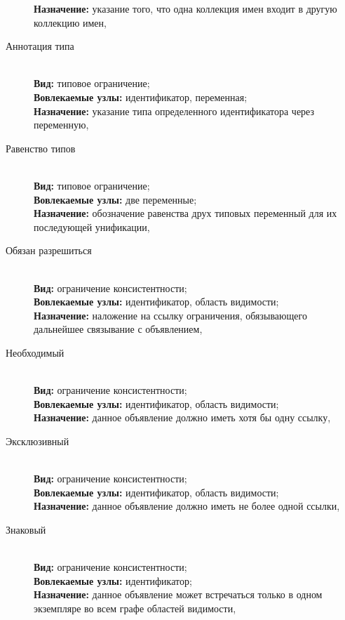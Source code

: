 \begin{description}
        \textbf{Назначение:} указание того, что одна коллекция
        имен входит в другую коллекцию имен, 
    \item[Аннотация типа] \
        \\
        \textbf{Вид:} типовое ограничение; \\
        \textbf{Вовлекаемые узлы:} идентификатор, переменная; \\
        \textbf{Назначение:} указание типа определенного
        идентификатора через переменную, 
    \item[Равенство типов] \
        \\
        \textbf{Вид:} типовое ограничение; \\
        \textbf{Вовлекаемые узлы:} две переменные; \\
        \textbf{Назначение:} обозначение равенства друх типовых 
        переменный для их последующей унификации, 
    \item[Обязан разрешиться] \
        \\
        \textbf{Вид:} ограничение консистентности; \\
        \textbf{Вовлекаемые узлы:} идентификатор, область видимости; \\
        \textbf{Назначение:} наложение на ссылку ограничения, обязывающего дальнейшее
        связывание с объявлением, 
    \item[Необходимый] \
        \\
        \textbf{Вид:} ограничение консистентности; \\
        \textbf{Вовлекаемые узлы:} идентификатор, область видимости; \\
        \textbf{Назначение:} данное объявление должно иметь хотя бы одну ссылку, 
    \item[Эксклюзивный] \
        \\
        \textbf{Вид:} ограничение консистентности; \\
        \textbf{Вовлекаемые узлы:} идентификатор, область видимости; \\
        \textbf{Назначение:} данное объявление должно иметь не более одной ссылки, 
    \item[Знаковый] \
        \\
        \textbf{Вид:} ограничение консистентности; \\
        \textbf{Вовлекаемые узлы:} идентификатор; \\
        \textbf{Назначение:} данное объявление может встречаться только
        в одном экземпляре во всем графе областей видимости, 
\end{description}

